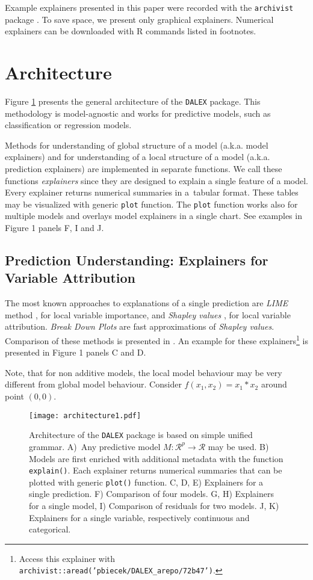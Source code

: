 \documentclass[twoside,11pt]{article}
\begin{document}
Example explainers presented in this paper were recorded with the \texttt{archivist} package \citep{archivist}. To save space, we present only graphical explainers. Numerical explainers can be downloaded with R commands listed in footnotes. 

\section{Architecture}
Figure \ref{fig:architecture} presents the general architecture of the \texttt{DALEX} package. This methodology is model-agnostic and works for predictive models, such as classification or regression models. 

Methods for understanding of global structure of a model (a.k.a. model explainers) and for  understanding of a local structure of a model (a.k.a. prediction explainers) are implemented in separate functions. We call these functions \textit{explainers} since they are designed to explain a single feature of a model. Every explainer returns numerical summaries in a~tabular format. These tables may be visualized with generic \texttt{plot} function. The \texttt{plot} function works also for multiple models and overlays model explainers in a single chart. See examples in Figure 1 panels F, I and J. 


\subsection{Prediction Understanding: Explainers for Variable Attribution}

The most known approaches to explanations of a single prediction are \textit{LIME} method \citep{lime},  for local variable importance, and \textit{Shapley values} \citep{shapley}, for local variable attribution. \textit{Break Down Plots} are fast approximations of \textit{Shapley values}. Comparison of these methods is presented in \citet{breakDownlive}.
An example for these explainers\footnote{Access this explainer with \texttt{archivist::aread('pbiecek/DALEX\_arepo/72b47')}.} is presented in Figure 1 panels C and D. 

Note, that for non additive models, the local model behaviour may be very different from global model behaviour. Consider $f(x_1, x_2) = x_1*x_2$ around point $(0, 0)$.


\begin{figure}[tb]
\centering
\texttt{[image: architecture1.pdf]}
\caption{\label{fig:architecture}Architecture of the \texttt{DALEX} package is based on simple  unified grammar. A)~Any predictive model $M: \mathcal R^p \rightarrow \mathcal R$ may be used. B) Models are first enriched with additional metadata with the function \texttt{explain()}. Each explainer returns numerical summaries that can be plotted with generic \texttt{plot()} function. C, D, E) Explainers for a single prediction. F) Comparison of four models. G, H) Explainers for a single model, I) Comparison of residuals for two models. J, K) Explainers for a single variable, respectively continuous and categorical.}
\end{figure}
\end{document}
